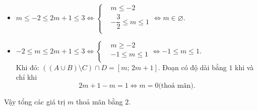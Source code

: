 \begin{ex}
{\begin{enumerate}[+)]
\begin{itemize}
Đoạn có độ dài bằng $1$ khi và chỉ khi \[3-m=1\Leftrightarrow m=2 \text{(thoả mãn)}.\]
\item $m\le -2\le 2m+1\le 3\Leftrightarrow \left\{ \begin{aligned}
& m\le -2 \\
& -\dfrac{3}{2}\le m\le 1 \\
\end{aligned} \right.\Leftrightarrow m\in \varnothing $.
\item $-2\le m\le 2m+1\le 3\Leftrightarrow \left\{ \begin{aligned}
& m\ge -2 \\
& -1\le m\le 1 \\
\end{aligned} \right.\Leftrightarrow -1\le m\le 1$.\\
Khi đó: $\left( \left( A\cup B \right)\setminus C \right)\cap D=\left[ m;\,2m+1 \right]$.
Đoạn có độ dài bằng $1$ khi và chỉ khi \[2m+1-m=1\Leftrightarrow m=0 \text{(thoả mãn)}.\]
\end{itemize}
\end{enumerate}
Vậy tổng các giá trị $m$ thoả mãn bằng $2$.}
\end{ex}
